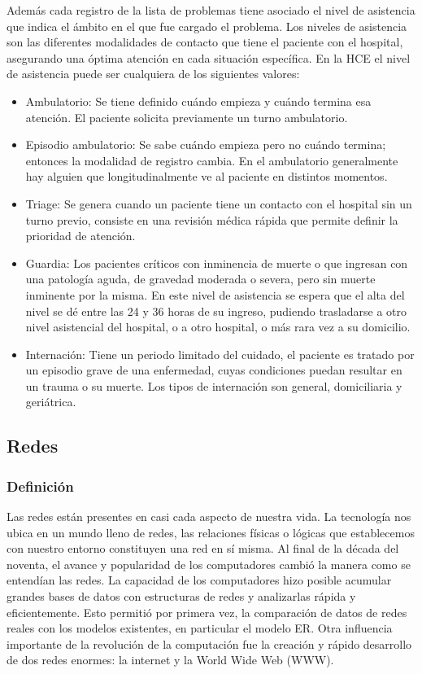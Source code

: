 Además cada registro de la lista de problemas tiene asociado el nivel de asistencia que indica el ámbito en el que fue cargado el problema. Los niveles de asistencia son las diferentes modalidades de contacto que tiene el paciente con el hospital, asegurando una óptima atención en cada situación específica. En la \acrshort{HCE} el nivel de asistencia puede ser cualquiera de los siguientes valores:

\begin{itemize}
\item Ambulatorio: Se tiene definido cuándo empieza y cuándo termina esa atención. El paciente solicita previamente un turno ambulatorio.
\item Episodio ambulatorio: Se sabe cuándo empieza pero no cuándo termina; entonces la modalidad de registro cambia. En el ambulatorio generalmente hay alguien que longitudinalmente ve al paciente en distintos momentos.
\item Triage: Se genera cuando un paciente tiene un contacto con el hospital sin un turno previo, consiste en una revisión médica rápida que permite definir la prioridad de atención.
\item Guardia: Los pacientes críticos con inminencia de muerte o que ingresan con una patología aguda, de gravedad moderada o severa, pero sin muerte inminente por la misma. En este nivel de asistencia se espera que el alta del nivel se dé entre las 24 y 36 horas de su ingreso, pudiendo trasladarse a otro nivel asistencial del hospital, o a otro hospital, o más rara vez a su domicilio.
\item Internación: Tiene un periodo limitado del cuidado, el paciente es tratado por un episodio grave de una enfermedad, cuyas condiciones puedan resultar en un trauma o su muerte. Los tipos de internación son general, domiciliaria y geriátrica.
\end{itemize}


\subsection{Redes}
\subsubsection{Definición}
Las redes están presentes en casi cada aspecto de nuestra vida. La tecnología nos ubica en un mundo lleno de redes, las relaciones físicas o lógicas que establecemos con nuestro entorno constituyen una red en sí misma. Al final de la década del noventa, el avance y popularidad de los computadores cambió la manera como se entendían las redes. La capacidad de los computadores hizo posible acumular grandes bases de datos con estructuras de redes y analizarlas rápida y eficientemente. Esto permitió por primera vez, la comparación de datos de redes reales con los modelos existentes, en particular el modelo ER. Otra influencia importante de la revolución de la computación fue la creación y rápido desarrollo de dos redes enormes: la internet y la World Wide Web (WWW). 

